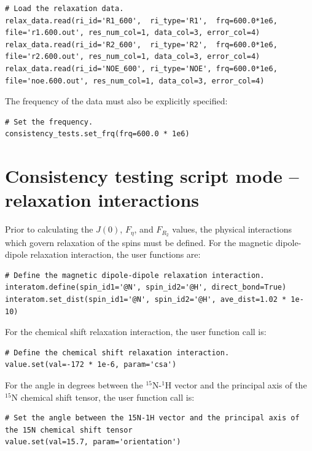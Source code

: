 \begin{lstlisting}[firstnumber=41]
# Load the relaxation data.
relax_data.read(ri_id='R1_600',  ri_type='R1',  frq=600.0*1e6, file='r1.600.out', res_num_col=1, data_col=3, error_col=4)
relax_data.read(ri_id='R2_600',  ri_type='R2',  frq=600.0*1e6, file='r2.600.out', res_num_col=1, data_col=3, error_col=4)
relax_data.read(ri_id='NOE_600', ri_type='NOE', frq=600.0*1e6, file='noe.600.out', res_num_col=1, data_col=3, error_col=4)
\end{lstlisting}

The frequency of the data must also be explicitly specified:

\begin{lstlisting}[firstnumber=62]
# Set the frequency.
consistency_tests.set_frq(frq=600.0 * 1e6)
\end{lstlisting}




\section{Consistency testing script mode -- relaxation interactions}

Prior to calculating the $J(0)$, $F_\eta$, and $F_{R_2}$ values, the physical interactions which govern relaxation of the spins must be defined.  For the magnetic dipole-dipole relaxation interaction, the user functions are:

\begin{lstlisting}[firstnumber=49]
# Define the magnetic dipole-dipole relaxation interaction.
interatom.define(spin_id1='@N', spin_id2='@H', direct_bond=True)
interatom.set_dist(spin_id1='@N', spin_id2='@H', ave_dist=1.02 * 1e-10)
\end{lstlisting}

For the chemical shift relaxation interaction, the user function call is:

\begin{lstlisting}[firstnumber=53]
# Define the chemical shift relaxation interaction.
value.set(val=-172 * 1e-6, param='csa')
\end{lstlisting}

For the angle in degrees between the $^{15}$N-$^1$H vector and the principal axis of the $^{15}$N chemical shift tensor, the user function call is:

\begin{lstlisting}[firstnumber=56]
# Set the angle between the 15N-1H vector and the principal axis of the 15N chemical shift tensor
value.set(val=15.7, param='orientation')
\end{lstlisting}


